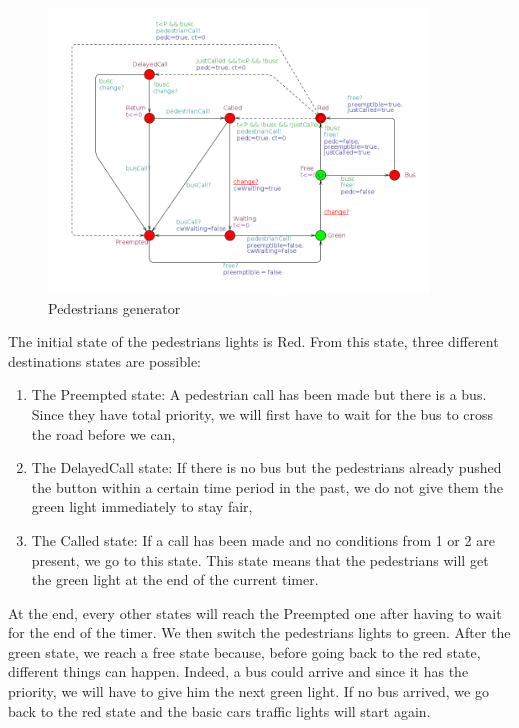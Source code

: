 \begin{figure}[H]\label{fig:crosswalk}
  \centering
    \includegraphics[width=0.9\textwidth]{picture/crosswalk.png}
    \caption{Pedestrians generator}
\end{figure}
\noindent The initial state of the pedestrians lights is Red. From this state, three different destinations states are possible:
\begin{enumerate}
  \item The Preempted state: A pedestrian call has been made but there is a bus. Since they have total priority, we will first have to wait for the bus to cross the road before we can,
  \item The DelayedCall state: If there is no bus but the pedestrians already pushed the button within a certain time period in the past, we do not give them the green light immediately to stay fair,
  \item The Called state: If a call has been made and no conditions from 1 or 2 are present, we go to this state. This state means that the pedestrians will get the green light at the end of the current timer.
\end{enumerate}
At the end, every other states will reach the Preempted one after having to wait for the end of the timer. We then switch the pedestrians lights to green. After the green state, we reach a free state because, before going back to the red state, different things can happen. Indeed, a bus could arrive and since it has the priority, we will have to give him the next green light. If no bus arrived, we go back to the red state and the basic cars traffic lights will start again. 

